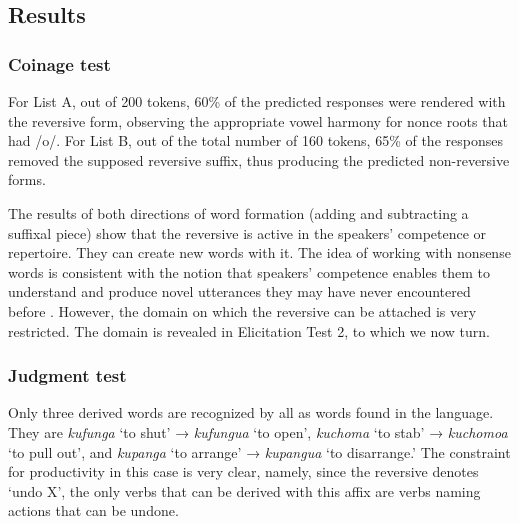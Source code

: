 \documentclass[output=paper]{langsci/langscibook}
\begin{document}
\subsection{Results}\label{sec:ngonyaningowa:4.2}
\subsubsection{Coinage test}\label{sec:ngonyaningowa:4.2.1}

\largerpage
For List A, out of 200 tokens, 60\% of the predicted responses were rendered with the reversive form, observing the appropriate vowel harmony for nonce roots that had /o/. For List B, out of the total number of 160 tokens, 65\% of the responses removed the supposed reversive suffix, thus producing the predicted non-reversive forms.

The results of both directions of word formation (adding and subtracting a suffixal piece) show that the reversive is active in the speakers’ competence or repertoire. They can create new words with it. The idea of working with nonsense words is consistent with the notion that speakers’ competence enables them to understand and produce novel utterances they may have never encountered before \citep{AronoffSchvaneveldt1978}. However, the domain on which the reversive can be attached is very restricted. The domain is revealed in Elicitation Test 2, to which we now turn.

\subsubsection{Judgment test}\label{sec:ngonyaningowa:4.2.2}

Only three derived words are recognized by all as words found in the language. They are \textit{kufunga} ‘to shut’ → \textit{kufungua} ‘to open’, \textit{kuchoma} ‘to stab’ → \textit{kuchomoa} ‘to pull out’, and \textit{kupanga} ‘to arrange’ → \textit{kupangua} ‘to disarrange.’ The constraint for productivity in this case is very clear, namely, since the reversive denotes ‘undo X’, the only verbs that can be derived with this affix are verbs naming actions that can be undone.
\end{document}
